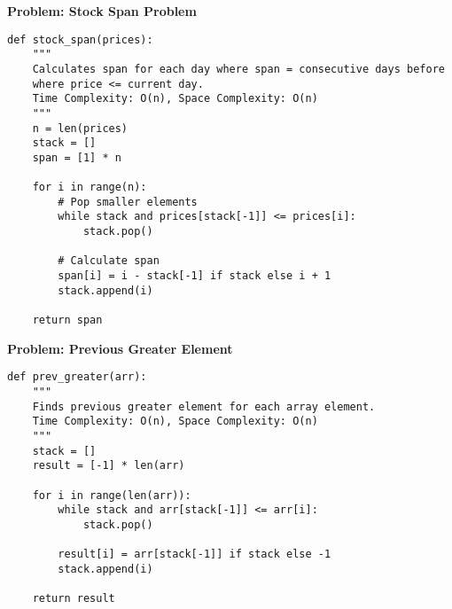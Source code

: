 \noindent\textbf{Problem: Stock Span Problem}
\begin{verbatim}
def stock_span(prices):
    """
    Calculates span for each day where span = consecutive days before
    where price <= current day.
    Time Complexity: O(n), Space Complexity: O(n)
    """
    n = len(prices)
    stack = []
    span = [1] * n
    
    for i in range(n):
        # Pop smaller elements
        while stack and prices[stack[-1]] <= prices[i]:
            stack.pop()
        
        # Calculate span
        span[i] = i - stack[-1] if stack else i + 1
        stack.append(i)
    
    return span
\end{verbatim}

\noindent\textbf{Problem: Previous Greater Element}
\begin{verbatim}
def prev_greater(arr):
    """
    Finds previous greater element for each array element.
    Time Complexity: O(n), Space Complexity: O(n)
    """
    stack = []
    result = [-1] * len(arr)
    
    for i in range(len(arr)):
        while stack and arr[stack[-1]] <= arr[i]:
            stack.pop()
        
        result[i] = arr[stack[-1]] if stack else -1
        stack.append(i)
    
    return result
\end{verbatim}

